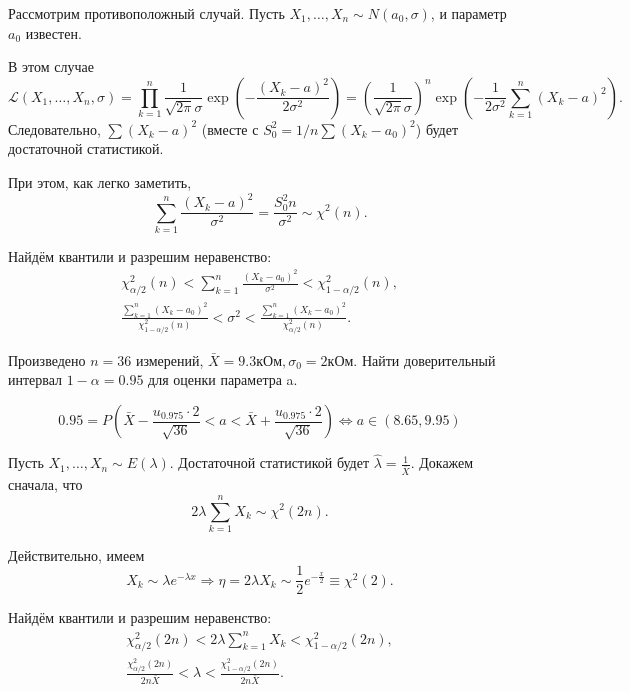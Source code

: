  \begin{ex}
  Рассмотрим противоположный случай. Пусть $X_1, \dots, X_n \sim N(a_0,
	\sigma)$,
	и параметр $a_0$ известен.

	В этом случае
	\[
		\mathscr{L} (X_1, \dots, X_n, \sigma) = \prod_{k=1}^n \frac{1}{\sqrt{2\pi}
		\sigma} \exp\left(-\frac{(X_k - a)^2}{2\sigma^2}\right) =
		\left(\frac{1}{\sqrt{2\pi}\sigma}\right)^n \exp\left(-\frac{1}{2\sigma^2}
		\sum_{k=1}^n (X_k-a)^2\right).
	\]
  Следовательно, $\sum (X_k-a)^2$ (вместе с $ S_0^2 = 1/n \sum(X_k - a_0)^2 $) будет достаточной статистикой.

	При этом, как легко заметить,
	\[
		\sum\limits_{k=1}^n \frac{(X_k-a)^2}{\sigma^2} = \frac{S^2_0 n}{\sigma^2}
		\sim \chi^2 (n).
	\]

	Найдём квантили и разрешим неравенство:
  \begin{gather*} 
		\chi^2_{\alpha/2} (n) < \sum_{k=1}^n \frac{(X_k - a_0)^2}{\sigma^2} <
		\chi^2_{1 - \alpha/2} (n), \\
		\frac{\sum_{k=1}^n (X_k-a_0)^2}{\chi^2_{1 - \alpha/2} (n)} < \sigma^2 <
		\frac{\sum_{k=1}^n (X_k - a_0)^2}{\chi^2_{\alpha/2}(n)}.
  \end{gather*}
\end{ex}

\begin{ex}
  Произведено $n=36$ измерений, $\bar X = 9.3 \text{кОм},  \sigma_0 = 2 \text{кОм}$. Найти доверительный интервал $1- \alpha = 0.95$ для оценки параметра a.

\[
  0.95 = P\left(\bar X - \frac{u_{0.975} \cdot 2}{\sqrt{36}} < a < \bar X + \frac{u_{0.975} \cdot 2}{\sqrt{36}}\right) \Leftrightarrow a \in (8.65, 9.95)
\]
\end{ex}

\begin{ex}
	Пусть
  $X_1, \dots, X_n \sim E(\lambda)$.
  Достаточной статистикой  будет $\hat \lambda = \frac{1}{\bar X}$. Докажем
	сначала, что
  \[
		2\lambda \sum_{k=1}^n X_k \sim \chi^2(2n).
	\]

	Действительно, имеем
	\[
		X_k \sim \lambda e^{-\lambda x} \Rightarrow \eta = 2\lambda X_k \sim \frac{1}{2}
		e^{-\frac{x}{2}} \equiv \chi^2 (2).
	\]

	Найдём квантили и разрешим неравенство: 
	\begin{gather*}
		\chi^2_{\alpha/2}(2n) < 2\lambda\sum_{k=1}^n X_k <
		\chi^2_{1-\alpha/2}(2n),\\
	\frac{\chi^2_{\alpha/2}(2n)}{2 n\bar X } < \lambda <
	\frac{\chi^2_{1-\alpha/2}(2n)}{2 n \bar X}.
	\end{gather*}
\end{ex}

